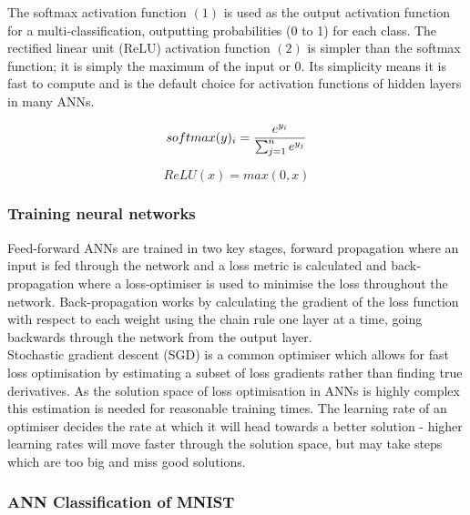 \documentclass[11pt]{article}
\begin{document}
The softmax activation function $(1)$ is used as the output activation function for a multi-classification, outputting probabilities (0 to 1) for each class. The rectified linear unit (ReLU) activation function $(2)$ is simpler than the softmax function; it is simply the maximum of the input or 0. Its simplicity means it is fast to compute and is the default choice for activation functions of hidden layers in many ANNs. \\

\begin{minipage}{.4\linewidth}
\begin{equation}
\centering
softmax(y)_i=\frac{e^{y_i}}{\sum_{j=1}^{n}{e^{y_j}}}
\end{equation}
\end{minipage} 
\begin{minipage}{.4\linewidth}
\begin{equation}
ReLU(x)=max(0,x)
\end{equation}
\end{minipage}

\subsubsection{Training neural networks}

Feed-forward ANNs are trained in two key stages, forward propagation where an input is fed through the network and a loss metric is calculated and back-propagation where a loss-optimiser is used to minimise the loss throughout the network. Back-propagation works by calculating the gradient of the loss function with respect to each weight using the chain rule one layer at a time, going backwards through the network from the output layer. \\

Stochastic gradient descent (SGD) is a common optimiser which allows for fast loss optimisation by estimating a subset of loss gradients rather than finding true derivatives. As the solution space of loss optimisation in ANNs is highly complex this estimation is needed for reasonable training times. The learning rate of an optimiser decides the rate at which it will head towards a better solution - higher learning rates will move faster through the solution space, but may take steps which are too big and miss good solutions.

\subsubsection{ANN Classification of MNIST}
\end{document}
